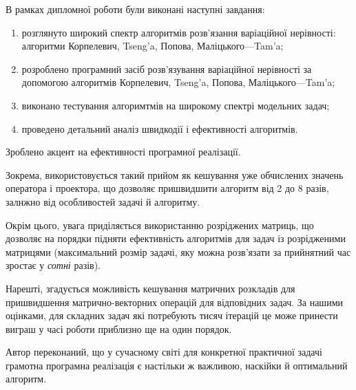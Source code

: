 В рамках дипломної роботи були виконані наступні завдання:
\begin{enumerate}[label=--]
    \item розглянуто широкий спектр алгоритмів розв'язання варіаційної нерівності: алгоритми Корпелевич, Tseng'a, Попова, Маліцького---Tam'a;
    \item розроблено програмний засіб розв'язування варіаційної нерівності за допомогою алгоритмів Корпелевич, Tseng'a, Попова, Маліцького---Tam'a;
    \item виконано тестування алгоримтмів на широкому спектрі модельних задач;
    \item проведено детальний аналіз швидкодії і ефективності алгоритмів.
\end{enumerate} \medskip

Зроблено акцент на ефективності програмної реалізації. \medskip

Зокрема, використовується такий прийом як кешування уже обчислених значень оператора і проектора, що дозволяє пришвидшити алгоритм від 2 до 8 разів, залнжно від особливостей задачі й алгоритму. \medskip

Окрім цього, увага приділяється використанню розріджених матриць, що дозволяє на порядки підняти ефективність алгоритмів для задач із розрідженими матрицями (максимальний розмір задачі, яку можна розв'язати за прийнятний час зростає у \emph{сотні} разів). \medskip

Нарешті, згадується можливість кешування матричних розкладів для пришвидшення мат\-рич\-но-век\-тор\-них операцій для відповідних задач. За нашими оцінками, для складних задач які потребують тисяч ітерацій це може принести виграш у часі роботи приблизно ще на один порядок. \medskip

Автор переконаний, що у сучасному світі для конкретної практичної задачі грамотна програмна реалізація є настільки ж важливою, наскійки й оптимальний алгоритм.